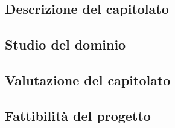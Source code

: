 \subsection{Descrizione del capitolato}

\subsection{Studio del dominio}

\subsection{Valutazione del capitolato}

\subsection{Fattibilità del progetto}

